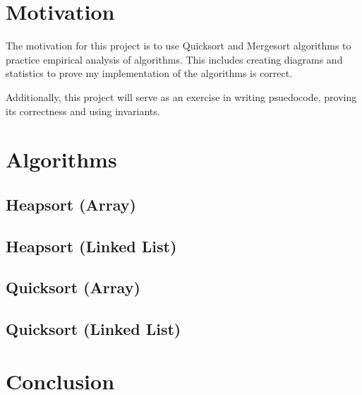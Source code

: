 \documentclass[a4paper,12pt]{article}
\begin{document}
\section{Motivation}

The motivation for this project is to use Quicksort and Mergesort algorithms to practice empirical analysis of algorithms.
This includes creating diagrams and statistics to prove my implementation of the algorithms is correct.

Additionally, this project will serve as an exercise in writing psuedocode, proving its correctness and using invariants.

\section{Algorithms}
\subsection{Heapsort (Array)}
\subsection{Heapsort (Linked List)}
\subsection{Quicksort (Array)}
\subsection{Quicksort (Linked List)}
\section{Conclusion}
\end{document}
